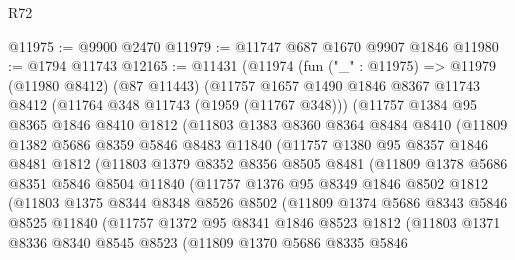 \begin{lexlean}{R72}
\begin{coremodule}
@11975 := @9900 @2470
@11979 := @11747 @687 @1670 @9907 @1846
@11980 := @1794 @11743
@12165 := @11431
    (@11974
      (fun ("_" : @11975) =>
      @11979
        (@11980 @8412)
        (@87 @11443)
        (@11757
          @1657
          @1490
          @1846
          @8367
          @11743
          @8412
          (@11764 @348 @11743 (@1959 (@11767 @348)))
          (@11757
            @1384
            @95
            @8365
            @1846
            @8410
            @1812
            (@11803
              @1383
              @8360
              @8364
              @8484
              @8410
              (@11809
                @1382
                @5686
                @8359
                @5846
                @8483
                @11840
                (@11757
                  @1380
                  @95
                  @8357
                  @1846
                  @8481
                  @1812
                  (@11803
                    @1379
                    @8352
                    @8356
                    @8505
                    @8481
                    (@11809
                      @1378
                      @5686
                      @8351
                      @5846
                      @8504
                      @11840
                      (@11757
                        @1376
                        @95
                        @8349
                        @1846
                        @8502
                        @1812
                        (@11803
                          @1375
                          @8344
                          @8348
                          @8526
                          @8502
                          (@11809
                            @1374
                            @5686
                            @8343
                            @5846
                            @8525
                            @11840
                            (@11757
                              @1372
                              @95
                              @8341
                              @1846
                              @8523
                              @1812
                              (@11803
                                @1371
                                @8336
                                @8340
                                @8545
                                @8523
                                (@11809
                                  @1370
                                  @5686
                                  @8335
                                  @5846

\end{coremodule}
\end{lexlean}
